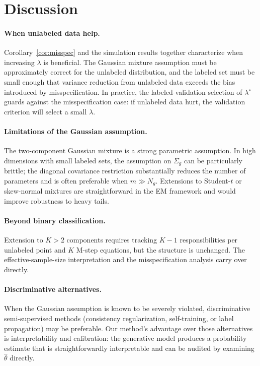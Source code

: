 \documentclass[11pt]{article}
\theoremstyle{definition}
\newcommand{\lam}{\lambda}
\newcommand{\Sig}{\Sigma}
\begin{document}
\section{Discussion}
\label{sec:discussion}

\paragraph{When unlabeled data help.}
Corollary~\ref{cor:misspec} and the simulation results together
characterize when increasing $\lam$ is beneficial.
The Gaussian mixture assumption must be approximately correct for the
unlabeled distribution, and the labeled set must be small enough
that variance reduction from unlabeled data exceeds the bias introduced
by misspecification.
In practice, the labeled-validation selection of $\lam^\star$ guards
against the misspecification case: if unlabeled data hurt, the
validation criterion will select a small $\lam$.

\paragraph{Limitations of the Gaussian assumption.}
The two-component Gaussian mixture is a strong parametric assumption.
In high dimensions with small labeled sets, the assumption on
$\Sig_g$ can be particularly brittle; the diagonal covariance
restriction substantially reduces the number of parameters and
is often preferable when $m\gg N_g$.
Extensions to Student-$t$ or skew-normal mixtures are straightforward
in the EM framework and would improve robustness to heavy tails.

\paragraph{Beyond binary classification.}
Extension to $K>2$ components requires tracking $K-1$ responsibilities per
unlabeled point and $K$ M-step equations, but the structure is unchanged.
The effective-sample-size interpretation and the misspecification
analysis carry over directly.

\paragraph{Discriminative alternatives.}
When the Gaussian assumption is known to be severely violated,
discriminative semi-supervised methods (consistency regularization,
self-training, or label propagation) may be preferable.
Our method's advantage over those alternatives is interpretability
and calibration: the generative model produces a probability estimate
that is straightforwardly interpretable and can be audited by examining
$\hat\theta$ directly.
\end{document}
